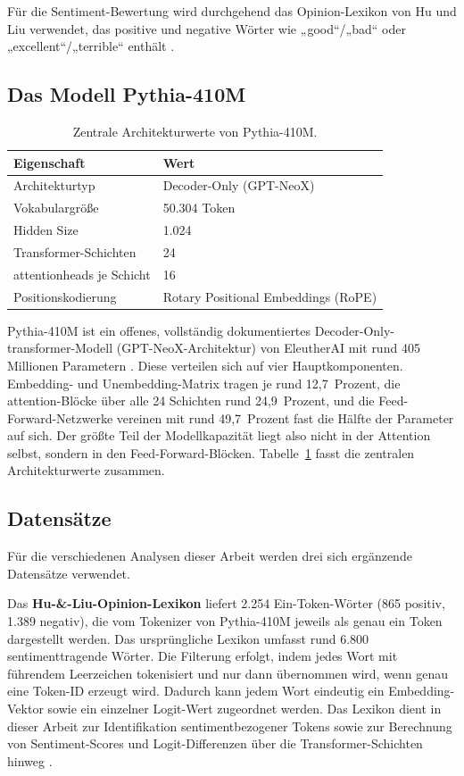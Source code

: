 Für die Sentiment-Bewertung wird durchgehend das Opinion-Lexikon von Hu und Liu verwendet, das positive und negative Wörter wie „good“/„bad“ oder „excellent“/„terrible“ enthält \cite{hu2004mining}.

\subsection{Das Modell Pythia-410M}

\begin{table}[H]
  \centering
  \caption{Zentrale Architekturwerte von Pythia-410M.}
  \label{tab:arch}
  \begin{tabular}{ll}
    \toprule
    Eigenschaft & Wert \\
    \midrule
    Architekturtyp & Decoder-Only (GPT-NeoX) \\
    Vokabulargröße & 50.304 Token \\
    Hidden Size & 1.024 \\
    Transformer-Schichten & 24 \\
    \glspl{attentionhead} je Schicht & 16 \\
    Positionskodierung & Rotary Positional Embeddings (RoPE) \\
    \bottomrule
  \end{tabular}
\end{table}

Pythia-410M ist ein offenes, vollständig dokumentiertes Decoder-Only-\gls{transformer}-Modell (GPT-NeoX-Architektur) von EleutherAI mit rund 405 Millionen Parametern \cite{biderman2023pythia}. Diese verteilen sich auf vier Hauptkomponenten. Embedding- und Unembedding-Matrix tragen je rund 12,7~Prozent, die \gls{attention}-Blöcke über alle 24 Schichten rund 24,9~Prozent, und die Feed-Forward-Netzwerke vereinen mit rund 49,7~Prozent fast die Hälfte der Parameter auf sich. Der größte Teil der Modellkapazität liegt also nicht in der Attention selbst, sondern in den Feed-Forward-Blöcken. Tabelle~\ref{tab:arch} fasst die zentralen Architekturwerte zusammen.


\subsection{Datensätze}

Für die verschiedenen Analysen dieser Arbeit werden drei sich ergänzende Datensätze verwendet. \par

Das \textbf{Hu-\&-Liu-Opinion-Lexikon} liefert 2.254 Ein-Token-Wörter (865 positiv, 1.389 negativ), die vom Tokenizer von Pythia-410M jeweils als genau ein Token dargestellt werden. Das ursprüngliche Lexikon umfasst rund 6.800 sentimenttragende Wörter. Die Filterung erfolgt, indem jedes Wort mit führendem Leerzeichen tokenisiert und nur dann übernommen wird, wenn genau eine Token-ID erzeugt wird. Dadurch kann jedem Wort eindeutig ein Embedding-Vektor sowie ein einzelner Logit-Wert zugeordnet werden. Das Lexikon dient in dieser Arbeit zur Identifikation sentimentbezogener Tokens sowie zur Berechnung von Sentiment-Scores und Logit-Differenzen über die Transformer-Schichten hinweg \cite{hu2004mining}. \par

